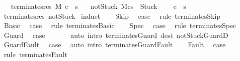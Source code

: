 \begin{isabellebody}
\ \ \ terminates{\isacharunderscore}res{\isacharcolon}\ {\isachardoublequoteopen}{\isasymGamma}{\isacharbar}\isactrlbsub M\isactrlesub {\isasymturnstile}\ c\ {\isasymdown}\ s{\isachardoublequoteclose}\isanewline
\ \ \ not{\isacharunderscore}Stuck{\isacharcolon}\ {\isachardoublequoteopen}{\isasymGamma}{\isacharbar}\isactrlbsub M\isactrlesub {\isasymturnstile}{\isasymlangle}c{\isacharcomma}s\ {\isasymrangle}\ {\isasymRightarrow}{\isasymnotin}{\isacharbraceleft}Stuck{\isacharbraceright}{\isachardoublequoteclose}\isanewline
\ \ \ {\isachardoublequoteopen}{\isasymGamma}{\isasymturnstile}\ c\ {\isasymdown}\ s{\isachardoublequoteclose}\isanewline
%
\isadelimproof
%
\endisadelimproof
%
\isatagproof
{}\isamarkupfalse%
\ terminates{\isacharunderscore}res\ not{\isacharunderscore}Stuck\isanewline
{}\isamarkupfalse%
\ {\isacharparenleft}induct{\isacharparenright}\isanewline
\ \ \isamarkupfalse%
\ Skip\ \isamarkupfalse%
\ {\isacharquery}case\ \isamarkupfalse%
\ {\isacharparenleft}rule\ terminates{\isachardot}Skip{\isacharparenright}\isanewline
{}\isamarkupfalse%
\isanewline
\ \ \isamarkupfalse%
\ Basic\ \isamarkupfalse%
\ {\isacharquery}case\ \isamarkupfalse%
\ {\isacharparenleft}rule\ terminates{\isachardot}Basic{\isacharparenright}\isanewline
{}\isamarkupfalse%
\isanewline
\ \ \isamarkupfalse%
\ Spec\ \isamarkupfalse%
\ {\isacharquery}case\ \isamarkupfalse%
\ {\isacharparenleft}rule\ terminates{\isachardot}Spec{\isacharparenright}\isanewline
{}\isamarkupfalse%
\isanewline
\ \ \isamarkupfalse%
\ Guard\ \isamarkupfalse%
\ {\isacharquery}case\ \isanewline
\ \ \ \ \isamarkupfalse%
\ {\isacharparenleft}auto\ intro{\isacharcolon}\ terminates{\isachardot}Guard\ dest{\isacharcolon}\ notStuck{\isacharunderscore}GuardD{\isacharparenright}\isanewline
{}\isamarkupfalse%
\isanewline
\ \ \isamarkupfalse%
\ GuardFault\ \isamarkupfalse%
\ {\isacharquery}case\ \isamarkupfalse%
\ {\isacharparenleft}auto\ intro{\isacharcolon}\ terminates{\isachardot}GuardFault{\isacharparenright}\isanewline
{}\isamarkupfalse%
\isanewline
\ \ \isamarkupfalse%
\ Fault\ \isamarkupfalse%
\ {\isacharquery}case\ \isamarkupfalse%
\ {\isacharparenleft}rule\ terminates{\isachardot}Fault{\isacharparenright}\isanewline

\end{isabellebody}
